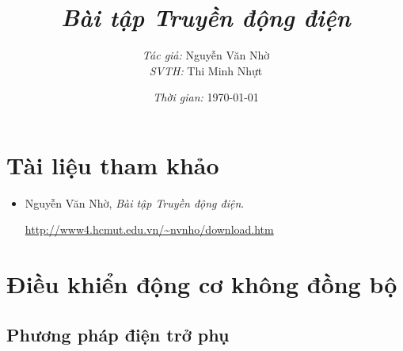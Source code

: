 \documentclass[12pt,a4paper]{article}
\begin{document}
\title{\textbf{\textit{Bài tập Truyền động điện}}}
\author{\textit{Tác giả:} Nguyễn Văn Nhờ \vspace{.5cm} \\ \textit{SVTH:} Thi Minh Nhựt}
\date{\textit{Thời gian:} \today}
\maketitle

\tableofcontents
\everymath{\displaystyle}
\newcommand{\vitalic}[1]{#1_\text{\textit{đm}}}
\newcommand{\vqitalic}[1]{#1_\text{\textit{uđm}}}
\newcommand{\unit}[1]{~#1}
\section*{Tài liệu tham khảo}
\begin{itemize}
\item Nguyễn Văn Nhờ, \emph{Bài tập Truyền động điện}.
\begin{center}
\href{http://www4.hcmut.edu.vn/~nvnho/download.htm}{\url{http://www4.hcmut.edu.vn/~nvnho/download.htm}}
\end{center}
\end{itemize}
\newpage
{}
\setcounter{page}{1}
\section{Điều khiển động cơ không đồng bộ}
\subsection{Phương pháp điện trở phụ}
\end{document}
